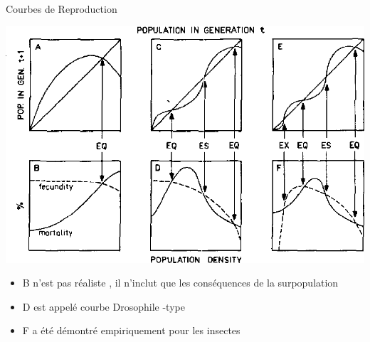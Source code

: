 \documentclass[11,aspectratio=1610]{beamer}
\begin{document}
\begin{frame}{Courbes de Reproduction}


\centering
\includegraphics[height=0.5\textheight]{img/reproduction_curves.png}
\begin{footnotesize}
\begin{itemize}
\item B n'est pas réaliste , il n'inclut que les conséquences de la surpopulation
\item D est appelé  courbe \alert{Drosophile -type} 
\item F a été démontré empiriquement pour les  \alert{insectes}
\end{itemize}

  \end{footnotesize}

\end{frame}
\end{document}
